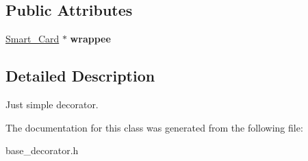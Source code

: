 \subsection*{Public Attributes}
\begin{DoxyCompactItemize}
\item 
\mbox{\label{classBase__Card__Decorator_a87669f85c4d5cc25bb0ce63a17b018b2}} 
\mbox{\hyperlink{classSmart__Card}{Smart\+\_\+\+Card}} $\ast$ {\bfseries wrappee}
\end{DoxyCompactItemize}


\subsection{Detailed Description}
Just simple decorator. 

The documentation for this class was generated from the following file\+:\begin{DoxyCompactItemize}
\item 
base\+\_\+decorator.\+h\end{DoxyCompactItemize}
